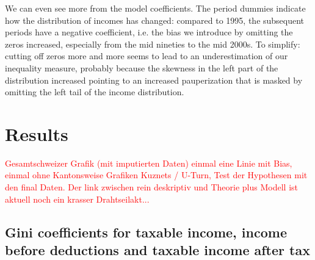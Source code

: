 \documentclass[twoside]{article}\usepackage[]{graphicx}\usepackage[]{color}
\begin{document}
\begin{multicols}{2}
We can even see more from the model coefficients. The period dummies indicate how the distribution of incomes has changed: compared to 1995, the subsequent periods have a negative coefficient, i.e. the bias we introduce by omitting the zeros increased, especially from the mid nineties to the mid 2000s. To simplify: cutting off zeros more and more seems to lead to an underestimation of our inequality measure, probably because the skewness in the left part of the distribution increased pointing to an increased pauperization that is masked by omitting the left tail of the income distribution.











\section{Results}

\textcolor{red}{Gesamtschweizer Grafik (mit imputierten Daten) einmal eine Linie mit Bias, einmal ohne
Kantonsweise Grafiken
Kuznets / U-Turn, Test der Hypothesen mit den final Daten. Der link zwischen rein deskriptiv  und Theorie plus Modell ist aktuell noch ein krasser Drahtseilakt...}

\subsection{Gini coefficients for taxable income, income before deductions and taxable income after tax}





\end{multicols}
\end{document}
